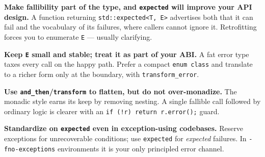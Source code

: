 \textbf{Make fallibility part of the type, and \lstinline|expected| will improve your API design.} A function returning \lstinline|std::expected<T, E>| advertises both that it can fail and the vocabulary of its failures, where callers cannot ignore it. Retrofitting forces you to enumerate \lstinline|E| --- usually clarifying.

\textbf{Keep \lstinline|E| small and stable; treat it as part of your ABI.} A fat error type taxes every call on the happy path. Prefer a compact \lstinline|enum class| and translate to a richer form only at the boundary, with \lstinline|transform_error|.

\textbf{Use \lstinline|and_then|/\lstinline|transform| to flatten, but do not over-monadize.} The monadic style earns its keep by removing nesting. A single fallible call followed by ordinary logic is clearer with an \lstinline|if (!r) return r.error();| guard.

\textbf{Standardize on \lstinline|expected| even in exception-using codebases.} Reserve exceptions for unrecoverable conditions; use \lstinline|expected| for \emph{expected} failures. In \lstinline|-fno-exceptions| environments it is your only principled error channel.
